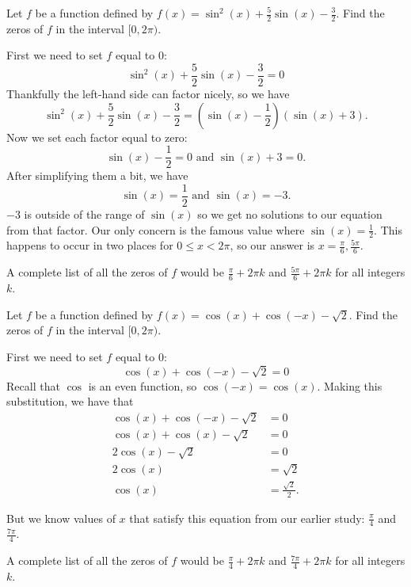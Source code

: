 \documentclass{ximera}
\begin{document}
\begin{example}
Let $f$ be a function defined by $f(x)=\sin^2(x)+\frac{5}{2}\sin(x)-\frac{3}{2}$. Find the zeros of $f$ in the interval $[0, 2\pi)$.

\begin{explanation}
First we need to set $f$ equal to $0$:\\
$$\sin^2(x)+\frac{5}{2}\sin(x)-\frac{3}{2}=0$$
Thankfully the left-hand side can factor nicely, so we have\\
\[
\sin^2(x)+\frac{5}{2}\sin(x)-\frac{3}{2}= \left(\sin(x)-\frac{1}{2}\right)(\sin(x)+3).
\]
Now we set each factor equal to zero:
\[
\sin(x)-\frac{1}{2}=0 \text{ and } \sin(x)+3 =0.
\]
After simplifying them a bit, we have
\[
\sin(x) = \frac{1}{2} \text{ and } \sin(x)=-3.
\]
$-3$ is outside of the range of $\sin(x)$ so we get no solutions to our equation from that factor. Our only concern is the famous value where $\sin(x) = \frac{1}{2}$. This happens to occur in two places for $0\leq x < 2\pi$, so our answer is $x=\frac{\pi}{6},\frac{5\pi}{6}$.

A complete list of all the zeros of $f$ would be $\frac{\pi}{6} + 2\pi k$ and $\frac{5\pi}{6} + 2\pi k$ for all integers $k$. 
\end{explanation}
\end{example}

\begin{example}
Let $f$ be a function defined by $f(x)=\cos(x) + \cos(-x) - \sqrt{2}$. Find the zeros of $f$ in the interval $[0, 2\pi)$.

\begin{explanation}
First we need to set $f$ equal to $0$:
$$\cos(x) + \cos(-x) - \sqrt{2}=0$$
Recall that $\cos$ is an even function, so $\cos(-x) = \cos(x)$. Making this substitution, we have that 
\begin{align*}
\cos(x) + \cos(-x) - \sqrt{2} & = 0 \\
\cos(x) + \cos(x) - \sqrt{2} & = 0 \\
2\cos(x) - \sqrt{2} & = 0 \\
2\cos(x) & = \sqrt{2} \\
\cos(x) & = \frac{\sqrt{2}}{2}.
\end{align*}

But we know values of $x$ that satisfy this equation from our earlier study: $\frac{\pi}{4}$ and $\frac{7\pi}{4}$. 

A complete list of all the zeros of $f$ would be $\frac{\pi}{4} + 2\pi k$ and $\frac{7\pi}{4} + 2\pi k$ for all integers $k$. 
\end{explanation}
\end{example}
\end{document}
